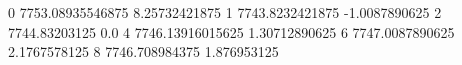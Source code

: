 0 7753.08935546875 8.25732421875
1 7743.8232421875 -1.0087890625
2 7744.83203125 0.0
4 7746.13916015625 1.30712890625
6 7747.0087890625 2.1767578125
8 7746.708984375 1.876953125
